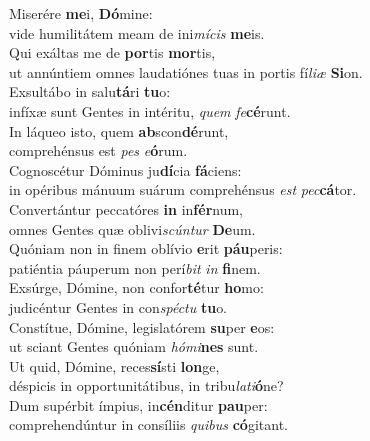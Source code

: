 \oddverse Miserére \textbf{me}i, \textbf{Dó}mine:~\*\\
\oddverse vide humilitátem meam de ini\textit{mí}\textit{cis} \textbf{me}is.\\
\evenverse Qui exáltas me de \textbf{por}tis \textbf{mor}tis,~\*\\
\evenverse ut annúntiem omnes laudatiónes tuas in portis fí\textit{li}\textit{æ} \textbf{Si}on.\\
\oddverse Exsultábo in salu\textbf{tá}ri \textbf{tu}o:~\*\\
\oddverse infíxæ sunt Gentes in intéritu, \textit{quem} \textit{fe}\textbf{cé}runt.\\
\evenverse In láqueo isto, quem \textbf{ab}scon\textbf{dé}runt,~\*\\
\evenverse comprehénsus est \textit{pes} \textit{e}\textbf{ó}rum.\\
\oddverse Cognoscétur Dóminus ju\textbf{dí}cia \textbf{fá}ciens:~\*\\
\oddverse in opéribus mánuum suárum comprehénsus \textit{est} \textit{pec}\textbf{cá}tor.\\
\evenverse Convertántur peccatóres \textbf{in} in\textbf{fér}num,~\*\\
\evenverse omnes Gentes quæ oblivi\textit{scún}\textit{tur} \textbf{De}um.\\
\oddverse Quóniam non in finem oblívio \textbf{e}rit \textbf{páu}peris:~\*\\
\oddverse patiéntia páuperum non perí\textit{bit} \textit{in} \textbf{fi}nem.\\
\evenverse Exsúrge, Dómine, non confor\textbf{té}tur \textbf{ho}mo:~\*\\
\evenverse judicéntur Gentes in con\textit{spé}\textit{ctu} \textbf{tu}o.\\
\oddverse Constítue, Dómine, legislatórem \textbf{su}per \textbf{e}os:~\*\\
\oddverse ut sciant Gentes quóniam \textit{hó}\textit{mi}\textbf{nes} sunt.\\
\evenverse Ut quid, Dómine, reces\textbf{sí}sti \textbf{lon}ge,~\*\\
\evenverse déspicis in opportunitátibus, in tribu\textit{la}\textit{ti}\textbf{ó}ne?\\
\oddverse Dum supérbit ímpius, in\textbf{cén}ditur \textbf{pau}per:~\*\\
\oddverse comprehendúntur in consíliis \textit{qui}\textit{bus} \textbf{có}gitant.\\
